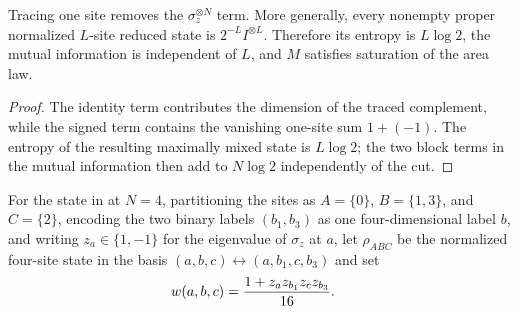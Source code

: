 \begin{lemma}
    \label{thm:cpsv_example412_literal_sal}
    \leanok
    Tracing one site removes the $\sigma_z^{\otimes N}$ term.  More generally,
    every nonempty proper normalized $L$-site reduced state is
    $2^{-L}I^{\otimes L}$.
    Therefore its entropy is $L\log 2$, the mutual information is independent
    of $L$, and $M$ satisfies saturation of the area law.
\end{lemma}
\begin{proof}\leanok
    The identity term contributes the dimension of the traced complement,
    while the signed term contains the vanishing one-site sum $1+(-1)$.  The
    entropy of the resulting maximally mixed state is $L\log 2$; the two block
    terms in the mutual information then add to $N\log 2$ independently of the
    cut.
\end{proof}

\begin{definition}
    \label{def:cpsv_example412_four_cycle_tripartition}
    \leanok
    For the state in
    \cite[Example~4.12, lines~932--938]{Cirac2016MPDO_arXiv} at $N=4$,
    partitioning the sites as
    $A=\{0\}$, $B=\{1,3\}$, and $C=\{2\}$, encoding the two binary labels
    $(b_1,b_3)$ as one four-dimensional label $b$, and writing
    $z_a\in\{1,-1\}$ for the eigenvalue of $\sigma_z$ at $a$, let $\rho_{ABC}$
    be the normalized four-site state in the basis
    $(a,b,c)\leftrightarrow(a,b_1,c,b_3)$ and set
    \begin{align}
        w(a,b,c) & =\frac{1+z_a z_{b_1}z_c z_{b_3}}{16}.
        \notag
    \end{align}
\end{definition}

